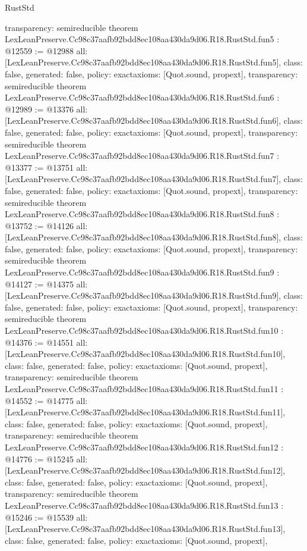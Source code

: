 \begin{lexlean}{RustStd}
\begin{coremodule}
{  transparency: semireducible
}
theorem LexLeanPreserve.Cc98c37aafb92bdd8ec108aa430da9d06.R18.RustStd.fun5 : @12559 := @12988 {
  all: [LexLeanPreserve.Cc98c37aafb92bdd8ec108aa430da9d06.R18.RustStd.fun5],
  class: false,
  generated: false,
  policy: exact{axioms: [Quot.sound, propext]},
  transparency: semireducible
}
theorem LexLeanPreserve.Cc98c37aafb92bdd8ec108aa430da9d06.R18.RustStd.fun6 : @12989 := @13376 {
  all: [LexLeanPreserve.Cc98c37aafb92bdd8ec108aa430da9d06.R18.RustStd.fun6],
  class: false,
  generated: false,
  policy: exact{axioms: [Quot.sound, propext]},
  transparency: semireducible
}
theorem LexLeanPreserve.Cc98c37aafb92bdd8ec108aa430da9d06.R18.RustStd.fun7 : @13377 := @13751 {
  all: [LexLeanPreserve.Cc98c37aafb92bdd8ec108aa430da9d06.R18.RustStd.fun7],
  class: false,
  generated: false,
  policy: exact{axioms: [Quot.sound, propext]},
  transparency: semireducible
}
theorem LexLeanPreserve.Cc98c37aafb92bdd8ec108aa430da9d06.R18.RustStd.fun8 : @13752 := @14126 {
  all: [LexLeanPreserve.Cc98c37aafb92bdd8ec108aa430da9d06.R18.RustStd.fun8],
  class: false,
  generated: false,
  policy: exact{axioms: [Quot.sound, propext]},
  transparency: semireducible
}
theorem LexLeanPreserve.Cc98c37aafb92bdd8ec108aa430da9d06.R18.RustStd.fun9 : @14127 := @14375 {
  all: [LexLeanPreserve.Cc98c37aafb92bdd8ec108aa430da9d06.R18.RustStd.fun9],
  class: false,
  generated: false,
  policy: exact{axioms: [Quot.sound, propext]},
  transparency: semireducible
}
theorem LexLeanPreserve.Cc98c37aafb92bdd8ec108aa430da9d06.R18.RustStd.fun10 : @14376 := @14551 {
  all: [LexLeanPreserve.Cc98c37aafb92bdd8ec108aa430da9d06.R18.RustStd.fun10],
  class: false,
  generated: false,
  policy: exact{axioms: [Quot.sound, propext]},
  transparency: semireducible
}
theorem LexLeanPreserve.Cc98c37aafb92bdd8ec108aa430da9d06.R18.RustStd.fun11 : @14552 := @14775 {
  all: [LexLeanPreserve.Cc98c37aafb92bdd8ec108aa430da9d06.R18.RustStd.fun11],
  class: false,
  generated: false,
  policy: exact{axioms: [Quot.sound, propext]},
  transparency: semireducible
}
theorem LexLeanPreserve.Cc98c37aafb92bdd8ec108aa430da9d06.R18.RustStd.fun12 : @14776 := @15245 {
  all: [LexLeanPreserve.Cc98c37aafb92bdd8ec108aa430da9d06.R18.RustStd.fun12],
  class: false,
  generated: false,
  policy: exact{axioms: [Quot.sound, propext]},
  transparency: semireducible
}
theorem LexLeanPreserve.Cc98c37aafb92bdd8ec108aa430da9d06.R18.RustStd.fun13 : @15246 := @15539 {
  all: [LexLeanPreserve.Cc98c37aafb92bdd8ec108aa430da9d06.R18.RustStd.fun13],
  class: false,
  generated: false,
  policy: exact{axioms: [Quot.sound, propext]},
}
\end{coremodule}
\end{lexlean}
